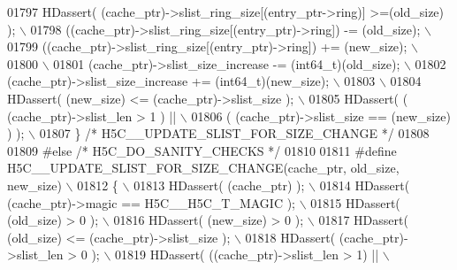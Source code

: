 \begin{DoxyCode}
01797 \textcolor{preprocessor}{    HDassert( (cache\_ptr)->slist\_ring\_size[(entry\_ptr->ring)] >=(old\_size) ); \(\backslash\)}
01798 \textcolor{preprocessor}{    ((cache\_ptr)->slist\_ring\_size[(entry\_ptr)->ring]) -= (old\_size);          \(\backslash\)}
01799 \textcolor{preprocessor}{    ((cache\_ptr)->slist\_ring\_size[(entry\_ptr)->ring]) += (new\_size);          \(\backslash\)}
01800 \textcolor{preprocessor}{                                                                              \(\backslash\)}
01801 \textcolor{preprocessor}{    (cache\_ptr)->slist\_size\_increase -= (int64\_t)(old\_size);                  \(\backslash\)}
01802 \textcolor{preprocessor}{    (cache\_ptr)->slist\_size\_increase += (int64\_t)(new\_size);                  \(\backslash\)}
01803 \textcolor{preprocessor}{                                                                              \(\backslash\)}
01804 \textcolor{preprocessor}{    HDassert( (new\_size) <= (cache\_ptr)->slist\_size );                        \(\backslash\)}
01805 \textcolor{preprocessor}{    HDassert( ( (cache\_ptr)->slist\_len > 1 ) ||                               \(\backslash\)}
01806 \textcolor{preprocessor}{              ( (cache\_ptr)->slist\_size == (new\_size) ) );                    \(\backslash\)}
01807 \textcolor{preprocessor}{\} }\textcolor{comment}{/* H5C\_\_UPDATE\_SLIST\_FOR\_SIZE\_CHANGE */}\textcolor{preprocessor}{}
01808 
01809 \textcolor{preprocessor}{#else }\textcolor{comment}{/* H5C\_DO\_SANITY\_CHECKS */}\textcolor{preprocessor}{}
01810 
01811 \textcolor{preprocessor}{#define H5C\_\_UPDATE\_SLIST\_FOR\_SIZE\_CHANGE(cache\_ptr, old\_size, new\_size)      \(\backslash\)}
01812 \textcolor{preprocessor}{\{                                                                             \(\backslash\)}
01813 \textcolor{preprocessor}{    HDassert( (cache\_ptr) );                                                  \(\backslash\)}
01814 \textcolor{preprocessor}{    HDassert( (cache\_ptr)->magic == H5C\_\_H5C\_T\_MAGIC );                       \(\backslash\)}
01815 \textcolor{preprocessor}{    HDassert( (old\_size) > 0 );                                               \(\backslash\)}
01816 \textcolor{preprocessor}{    HDassert( (new\_size) > 0 );                                               \(\backslash\)}
01817 \textcolor{preprocessor}{    HDassert( (old\_size) <= (cache\_ptr)->slist\_size );                        \(\backslash\)}
01818 \textcolor{preprocessor}{    HDassert( (cache\_ptr)->slist\_len > 0 );                                   \(\backslash\)}
01819 \textcolor{preprocessor}{    HDassert( ((cache\_ptr)->slist\_len > 1) ||                                 \(\backslash\)}

\end{DoxyCode}

